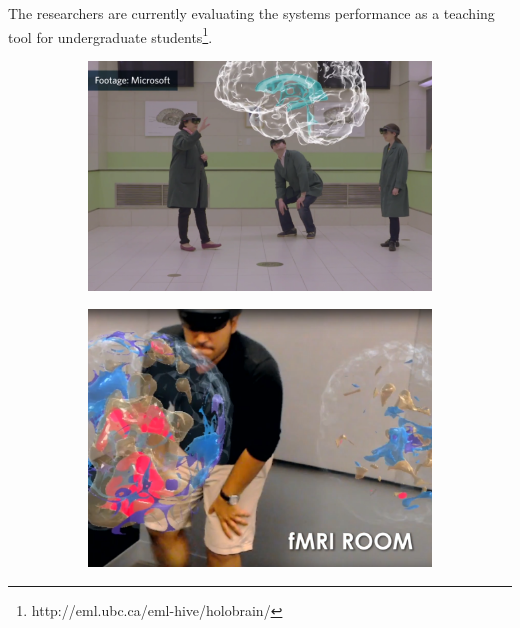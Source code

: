 The researchers are currently evaluating the systems performance as a teaching tool for undergraduate students\footnote{http://eml.ubc.ca/eml-hive/holobrain/}. 


\begin{figure}[H]
    \begin{subfigure}[t]{\textwidth}
        \includegraphics[width=\textwidth,trim={0 5cm 0 0.5cm},clip]{fig/holobraincollab}
    \end{subfigure}
    \begin{subfigure}[b]{0.33\textwidth}
        \includegraphics[width=\textwidth]{fig/holobrainfmri.png}
    \end{subfigure}
    \begin{subfigure}[b]{0.33\textwidth}

\end{subfigure}
\end{figure}
